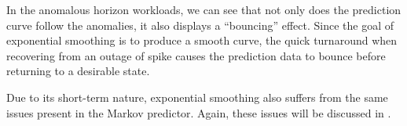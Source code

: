 In the anomalous horizon workloads, we can see that not only does the prediction curve follow the anomalies, it also displays a ``bouncing'' effect. Since the goal of exponential smoothing is to produce a smooth curve, the quick turnaround when recovering from an outage of spike causes the prediction data to bounce before returning to a desirable state.

Due to its short-term nature, exponential smoothing also suffers from the same issues present in the Markov predictor. Again, these issues will be discussed in .

